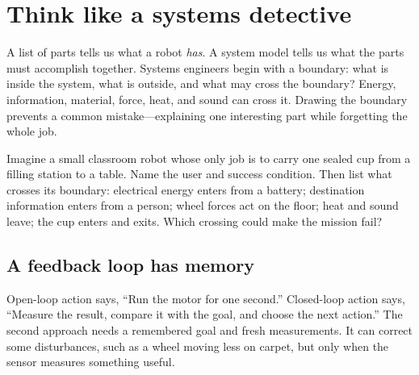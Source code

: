 
\chapter{Think like a systems detective}

A list of parts tells us what a robot \emph{has}. A system model tells us what the parts must accomplish together. Systems engineers begin with a boundary: what is inside the system, what is outside, and what may cross the boundary? Energy, information, material, force, heat, and sound can cross it. Drawing the boundary prevents a common mistake---explaining one interesting part while forgetting the whole job.

\begin{missionbox}[title={THE WATER-DELIVERY ROBOT}]
Imagine a small classroom robot whose only job is to carry one sealed cup from a filling station to a table. Name the user and success condition. Then list what crosses its boundary: electrical energy enters from a battery; destination information enters from a person; wheel forces act on the floor; heat and sound leave; the cup enters and exits. Which crossing could make the mission fail?
\end{missionbox}

\section*{A feedback loop has memory}

Open-loop action says, ``Run the motor for one second.'' Closed-loop action says, ``Measure the result, compare it with the goal, and choose the next action.'' The second approach needs a remembered goal and fresh measurements. It can correct some disturbances, such as a wheel moving less on carpet, but only when the sensor measures something useful.

\begin{center}
\end{center}

